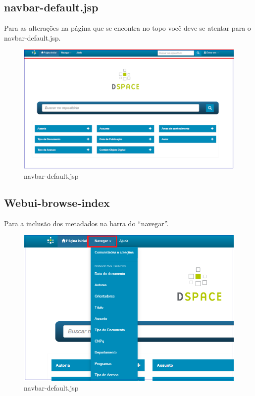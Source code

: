 \documentclass[12pt,hidelinks]{article}
\begin{document}
\subsection{navbar-default.jsp}
Para as alterações na página que se encontra no topo você deve se atentar para o navbar-default.jsp.

\begin{figure}[!htp]
                \centering
                \includegraphics[scale=0.5]{figura/navbar-default.png}
                \caption{navbar-default.jsp}
            \label{Rotulo}
        \end{figure}

\newpage  

\subsection{Webui-browse-index}

Para a inclusão dos metadados na barra do “navegar”. 

    \begin{figure}[!htp]
        \centering
        \includegraphics[scale=0.5]{figura/navegar1.png}
        \caption{navbar-default.jsp}
        \label{Rotulo}
     \end{figure}
\end{document}
